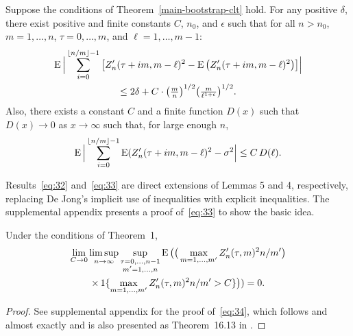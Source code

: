 \documentclass[11pt]{article}
\begin{document}
\begin{lem}\label{dejong-restatement-lemma}
\newcommand{\isum}{\sum_{i=0}^{\lfloor n/m \rfloor - 1}}
  Suppose the conditions of Theorem~\ref{main-bootstrap-clt} hold.
  For any positive $\delta$, there exist positive and finite constants
  $C$, $n_0$, and $\epsilon$ such that
  for all $n > n_0$, $m = 1,\dots,n$, $\tau = 0,\dots,m$, and $\ell =
  1,\dots,m-1$:
\begin{multline}\label{eq:32}
    \E \Big\lvert \isum \big[Z_n'(\tau + i m, m - \ell)^2
    - \E \big(Z_n'(\tau + i m, m - \ell)^2\big) \big]\Big\rvert \\
    \leq 2 \delta + C \cdot \big(\tfrac{m}{n}\big)^{1/2}
    \big(\tfrac{m}{\ell^{1+\epsilon}}\big)^{1/2}.
\end{multline}
Also, there exists a constant $C$ and a finite function $D(x)$ such
that $D(x) \to 0$ as $x \to \infty$ such that, for large enough $n$,
  \begin{equation}
    \label{eq:33}
    \E \Big\lvert \isum \E(Z_n'(\tau + i m, m - \ell)^2
    - \sigma^2 \Big\rvert \leq C\, D(\ell).
  \end{equation}
\end{lem}

Results~\eqref{eq:32} and~\eqref{eq:33} are direct extensions of
 Lemmas 5 and 4, respectively, replacing De Jong's
implicit use of inequalities with explicit inequalities. The
supplemental appendix presents a proof of~\eqref{eq:33} to show the
basic idea.

\begin{lem}\label{zsq-uniform-integrability-lemma}
\newcommand{\uiterm}{\max_{m \in 1,\dots,m'} \Big(
  \sum_{t \in I_n(\tau, m)} (X_{nt} - \mu_{nt})\Big)^2 \Big/
  \sum_{t\in I_n(\tau, m')} c_{nt}^2}
\newcommand{\uitermb}{(1/m') \max_{m \in 1,\dots,m'} \Big(
  \sum_{t \in I_n^*(\tau, m)} (X_{nt} - \mu_{nt})\Big)^2}
  Under the conditions of Theorem~1,
  \begin{multline}\label{eq:34}
    \lim_{C \to 0} \limsup_{n \to \infty} \sup_{\substack{\tau = 0,\dots,n-1 \\  m' = 1,\dots,n}}
    \operatorname{E}\big(\big(\max_{m=1,\dots,m'} Z'_n(\tau, m)^2 n / m'\big) \\
    \times\operatorname{1}\{\max_{m=1,\dots,m'} Z'_n(\tau, m)^2 n / m' > C\}\big)) = 0.
  \end{multline}
\end{lem}

\begin{proof}
  See supplemental appendix for the proof of~\eqref{eq:34}, which
  follows \citet[Lemma 6.5]{Mcl:75b} and \citet[Lemma 3.5]{Mcl:77}
  almost exactly and is also presented as Theorem~16.13 in
  \citet{Dav:94}.
\end{proof}


\end{document}
